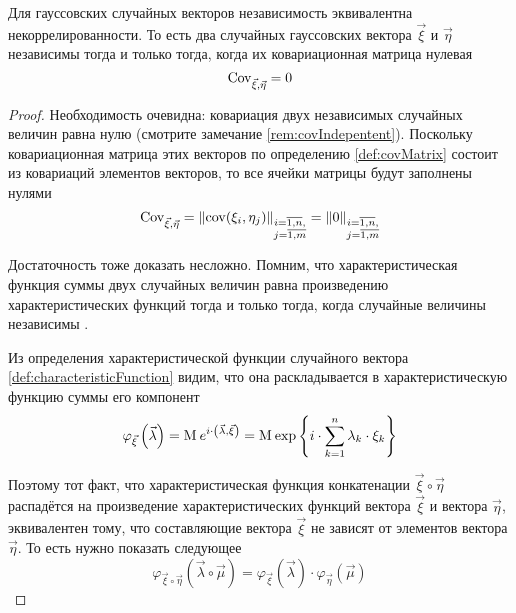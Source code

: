 \begin{theorem}
  \label{theorem:gaussianVector:independence}
  Для гауссовских случайных векторов независимость эквивалентна
  некоррелированности.
  То есть два случайных гауссовских вектора $\vec{\xi}$ и $\vec{\eta}$
  независимы тогда и только тогда, когда их ковариационная матрица нулевая
  $$\operatorname{Cov}^{}_{\vec{\xi}, \vec{\eta}} = 0$$
\end{theorem}
\begin{proof}
  Необходимость очевидна: ковариация двух независимых случайных величин равна
  нулю (смотрите замечание \ref{rem:covIndepentent}). Поскольку
  ковариационная матрица этих векторов по определению \ref{def:covMatrix}
  состоит из ковариаций элементов векторов, то все ячейки матрицы будут
  заполнены нулями
  $$\operatorname{Cov}^{}_{\vec{\xi}, \vec{\eta}}
      = \left\| \operatorname{cov}\!\left( \xi_i, \eta_j \right) \right\|_{
      \substack{i= \overline{1,n},\\j= \overline{1,m}}}
      = \left\| 0 \right \|_{
      \substack{i= \overline{1,n},\\j= \overline{1,m}}}$$

  Достаточность тоже доказать несложно. Помним, что характеристическая
  функция суммы двух случайных величин равна произведению характеристических
  функций тогда и только тогда, когда случайные величины независимы
  \cite[с.~354]{Shiryayev1}.

  Из определения характеристической функции случайного вектора
  \ref{def:characteristicFunction} видим, что она раскладывается в
  характеристическую функцию суммы его компонент
  $$\varphi_{\vec{\xi}}\left( \vec{\lambda} \right)
      = \operatorname{M}_{} e^{i \cdot \left( \vec{\lambda}, \vec{\xi} \right)}
      = \operatorname{M}_{} 
      \exp{\left\{ i \cdot \sum_{k=1}^n \lambda_k \cdot \xi_k \right\}}$$

  Поэтому тот факт, что характеристическая функция конкатенации
  $\vec{\xi} \circ \vec{\eta}$ распадётся на произведение характеристических
  функций вектора $\vec{\xi}$ и вектора $\vec{\eta}$, эквивалентен тому, что
  составляющие вектора $\vec{\xi}$ не зависят от элементов вектора
  $\vec{\eta}$. То есть нужно показать следующее
  $$\varphi_{\vec{\xi} \circ \vec{\eta}}\left(
      \vec{\lambda} \circ \vec{\mu} \right)
      = \varphi_{\vec{\xi}}\left( \vec{\lambda} \right)
      \cdot \varphi_{\vec{\eta}}\left( \vec{\mu} \right)$$


\end{proof}
